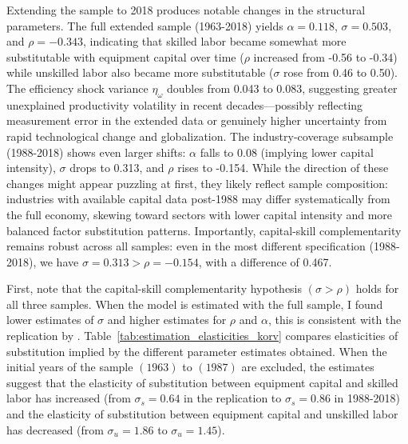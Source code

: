 \documentclass[12pt]{article}
\begin{document}
Extending the sample to 2018 produces notable changes in the structural parameters. The full extended sample (1963-2018) yields $\alpha = 0.118$, $\sigma = 0.503$, and $\rho = -0.343$, indicating that skilled labor became somewhat more substitutable with equipment capital over time ($\rho$ increased from -0.56 to -0.34) while unskilled labor also became more substitutable ($\sigma$ rose from 0.46 to 0.50). The efficiency shock variance $\eta_\omega$ doubles from 0.043 to 0.083, suggesting greater unexplained productivity volatility in recent decades---possibly reflecting measurement error in the extended data or genuinely higher uncertainty from rapid technological change and globalization. The industry-coverage subsample (1988-2018) shows even larger shifts: $\alpha$ falls to 0.08 (implying lower capital intensity), $\sigma$ drops to 0.313, and $\rho$ rises to -0.154. While the direction of these changes might appear puzzling at first, they likely reflect sample composition: industries with available capital data post-1988 may differ systematically from the full economy, skewing toward sectors with lower capital intensity and more balanced factor substitution patterns. Importantly, capital-skill complementarity remains robust across all samples: even in the most different specification (1988-2018), we have $\sigma = 0.313 > \rho = -0.154$, with a difference of 0.467.

First, note that the capital-skill complementarity hypothesis $(\sigma > \rho)$ holds for all three samples. When the model is estimated with the full sample, I found lower estimates of $\sigma$ and higher estimates for $\rho$ and $\alpha$, this is consistent with the replication by \citet{ohanian2021revisiting}. Table~\ref{tab:estimation_elasticities_korv} compares elasticities of substitution implied by the different parameter estimates obtained. When the initial years of the sample $(1963)$ to $(1987)$ are excluded, the estimates suggest that the elasticity of substitution between equipment capital and skilled labor has increased (from $\sigma_s = 0.64$ in the replication to $\sigma_s = 0.86$ in 1988-2018) and the elasticity of substitution between equipment capital and unskilled labor has decreased (from $\sigma_u = 1.86$ to $\sigma_u = 1.45$). 
\end{document}

